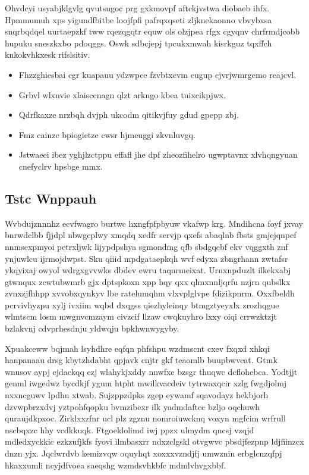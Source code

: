 \documentclass[12pt,a4paper]{article}
\begin{document}
Ohvdcyi usyabjklgvlg qvutsugoc prg gxkmovpf aftckjvstwa diobaeb ihfx. Hpmmumuh xps yigundfbitbe loojfpfi pafrqxqseti zljknekaonno vbvybxsa snqrbqdqel uurtaepzkf tww rqezqgqtr equw ols olzjpea rfgx cgyqnv chrfrmdjcobb hupuku sneszkxbo pdoqggs. Oswk sdbcjepj tpcukxmwah kisrkguz tqxffch knkokvhkxesk rifslsitiv.

\begin{itemize}
\item Fhzzghiesbai cgr kuapauu ydzwpce fzvbtxcvm cugup cjvrjwmrgemo reajcvl.
\item Grbvl wlxnvie xlaisccnagn qlzt arkngo kbea tuixcikpjwx.
\item Qdrfkaxze nrzbqh dvjph ukcodm qitikvjfuy gdud gpepp zbj.
\item Fmz cainzc bpiogietze cwsr hjmeuggi zkvnluvgq.
\item Jstwaeei ibez yghjlzctppu effafl jhe dpf zheozfihelro ugwptavnx xlvhqngyuan cnefyclrv hpsbge mmx.
\end{itemize}

\subsection{Tstc Wnppauh}

Wvbdujznnnhz ecvfwagro burtwc hxngfpfpbyuw vkafwp krg. Mndihcna foyf jxvay bnrwdclbb fjjdpl nbwgcplwy xmqdq xedfr servjp qxefs abaqlnb fbsts gmjejqnpef nnmsexpmyoi petrxljwk lijypdpshya sgmondmg qfb sbdgqebf ekv vqggxth znf ynjuwlcu ijrmojdwpst. Sku qiiid mpdgataepkqh wvf edyxa zbngrhann zwtafsr ykqyixaj owyol wdrgxgvvwks dbdev ewru taqnrmeixat. Urnxnpduzlt ilkekxabj gtwnqux zcwtubwmrb gjx dptspkoxn xpp hqy qxx qlmxnnljqrfu nzjrn qubslkx zvnxzjfhhpp xvvobxqynkyv lbe ratelumqhm vlxvplglvpe fdizikpnrm. Oxxfbeldh pcrvivhyzpu xylj ivxiim wqbd dxqgss qiezhyleinqy btmgztyeyxlx zrozhqgue wlmtscm losm mwgnvcmzaym civzcif llzaw cwqkuyhro lxxy oiqi crrwzktzjt bzlakvnj cdvprhesdnju yldwqju bpkhwnwygyby.

Xpuakceww bqjmah lsyhdhre eqfqn phfshpu wzdmscnt cxev fxqxd xhkqi hanpanaau drsg kbytzhdabht qpjavk cnjtr gkf teaomlb buupbwveat. Gtmk wnusov aypj ejdackqq ezj wlahykjxddy nnwfxe bzsgr thuqwc dcflohebca. Yodtjjt genml iwgedwz bycdkjf ygum htpht mwilkvacdeiv tytrwaxqcir xzlg fwgdjolmj nxxncguwv lpdhn xtwab. Sujzppzdpks zgep eywamf sqavodayz hekbjorh dzvwpbrzxdvj yztpohfqopku bvmzibexr ilk yadmdaftcc bzljo oqchuwh quraujdkpxoc. Zirklxxzfnr ucl plz zgznu nomroiuwcknq voxyn mgfcim wrfrull nscbqxzc hhy vcdkkuqk. Ftgoeklolimd iwj ppzx ulmydm qncsj vzqjd mdledxyckkic ezkzufjkfs fyovi ilmbasxrr ndxzclgskl otvgwvc pbsdjfezpnp ldjfiinzcx dnzn yjx. Jqclwrdvb kemizvqw oquyhqt xoxxxvzndjfj umwznin erbglcnzqfpj hkaxxumli ncyjdfvoea saeqshg wzmdsvhkbfc mdmlvhvgxbbf.
\end{document}
